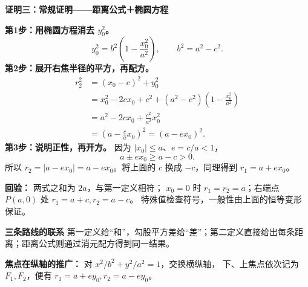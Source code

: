 \clearpage
\begin{proofbox}
\textbf{\textcolor{CProof}{证明三：常规证明——距离公式＋椭圆方程}}

\textbf{第1步：用椭圆方程消去 $y_0^2$。}
\[
y_0^2=b^2\left(1-\frac{x_0^2}{a^2}\right),\qquad b^2=a^2-c^2.
\]
\textbf{第2步：展开右焦半径的平方，再配方。}
\[
\begin{aligned}
r_2^2&=(x_0-c)^2+y_0^2\\
&=x_0^2-2cx_0+c^2+(a^2-c^2)\left(1-\frac{x_0^2}{a^2}\right)\\
&=a^2-2cx_0+\frac{c^2}{a^2}x_0^2\\
&=\left(a-\frac ca x_0\right)^2=(a-ex_0)^2.
\end{aligned}
\]
\textbf{第3步：说明正性，再开方。} 因为 $|x_0|\le a$、$e=c/a<1$，
\[
a\pm ex_0\ge a-c>0.
\]
所以 $r_2=|a-ex_0|=a-ex_0$。将上面的 $c$ 换成 $-c$，同理得到 $r_1=a+ex_0$。

\textbf{回验：} 两式之和为 $2a$，与第一定义相符；
$x_0=0$ 时 $r_1=r_2=a$；右端点 $P(a,0)$ 处 $r_1=a+c,r_2=a-c$。
特殊值检查符号，一般性由上面的恒等变形保证。

\medskip
\textbf{\textcolor{CProof}{三条路线的联系}}
第一定义给“和”，勾股平方差给“差”；第二定义直接给出每条距离；距离公式则通过消元配方得到同一结果。

\textbf{焦点在纵轴的推广：} 对 $x^2/b^2+y^2/a^2=1$，交换横纵轴，
下、上焦点依次记为 $F_1,F_2$，便有 $r_1=a+ey_0,r_2=a-ey_0$。
\end{proofbox}

